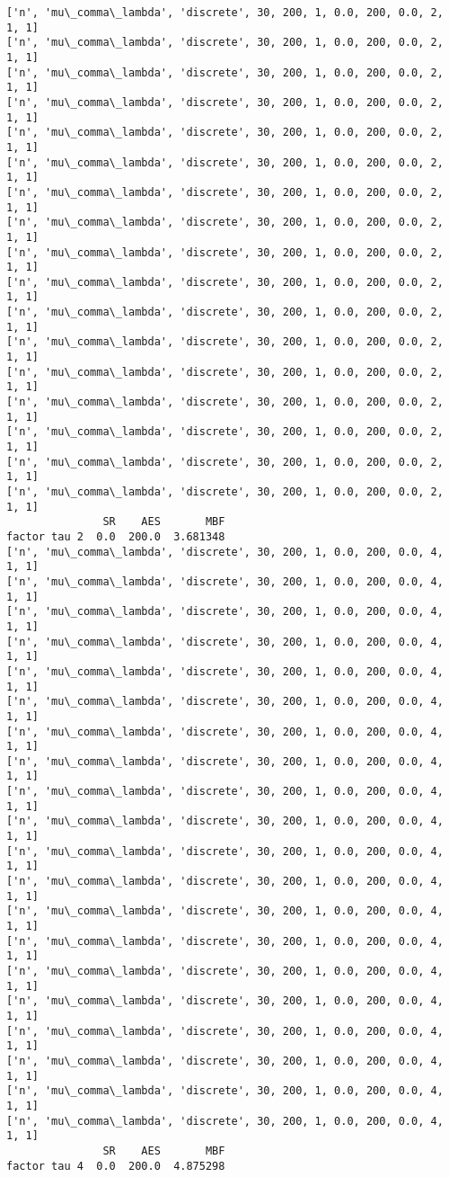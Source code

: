 \documentclass[11pt]{article}
\begin{document}
\begin{Verbatim}[commandchars=\\\{\}]
['n', 'mu\_comma\_lambda', 'discrete', 30, 200, 1, 0.0, 200, 0.0, 2, 1, 1]
['n', 'mu\_comma\_lambda', 'discrete', 30, 200, 1, 0.0, 200, 0.0, 2, 1, 1]
['n', 'mu\_comma\_lambda', 'discrete', 30, 200, 1, 0.0, 200, 0.0, 2, 1, 1]
['n', 'mu\_comma\_lambda', 'discrete', 30, 200, 1, 0.0, 200, 0.0, 2, 1, 1]
['n', 'mu\_comma\_lambda', 'discrete', 30, 200, 1, 0.0, 200, 0.0, 2, 1, 1]
['n', 'mu\_comma\_lambda', 'discrete', 30, 200, 1, 0.0, 200, 0.0, 2, 1, 1]
['n', 'mu\_comma\_lambda', 'discrete', 30, 200, 1, 0.0, 200, 0.0, 2, 1, 1]
['n', 'mu\_comma\_lambda', 'discrete', 30, 200, 1, 0.0, 200, 0.0, 2, 1, 1]
['n', 'mu\_comma\_lambda', 'discrete', 30, 200, 1, 0.0, 200, 0.0, 2, 1, 1]
['n', 'mu\_comma\_lambda', 'discrete', 30, 200, 1, 0.0, 200, 0.0, 2, 1, 1]
['n', 'mu\_comma\_lambda', 'discrete', 30, 200, 1, 0.0, 200, 0.0, 2, 1, 1]
['n', 'mu\_comma\_lambda', 'discrete', 30, 200, 1, 0.0, 200, 0.0, 2, 1, 1]
['n', 'mu\_comma\_lambda', 'discrete', 30, 200, 1, 0.0, 200, 0.0, 2, 1, 1]
['n', 'mu\_comma\_lambda', 'discrete', 30, 200, 1, 0.0, 200, 0.0, 2, 1, 1]
['n', 'mu\_comma\_lambda', 'discrete', 30, 200, 1, 0.0, 200, 0.0, 2, 1, 1]
['n', 'mu\_comma\_lambda', 'discrete', 30, 200, 1, 0.0, 200, 0.0, 2, 1, 1]
['n', 'mu\_comma\_lambda', 'discrete', 30, 200, 1, 0.0, 200, 0.0, 2, 1, 1]
               SR    AES       MBF
factor tau 2  0.0  200.0  3.681348
['n', 'mu\_comma\_lambda', 'discrete', 30, 200, 1, 0.0, 200, 0.0, 4, 1, 1]
['n', 'mu\_comma\_lambda', 'discrete', 30, 200, 1, 0.0, 200, 0.0, 4, 1, 1]
['n', 'mu\_comma\_lambda', 'discrete', 30, 200, 1, 0.0, 200, 0.0, 4, 1, 1]
['n', 'mu\_comma\_lambda', 'discrete', 30, 200, 1, 0.0, 200, 0.0, 4, 1, 1]
['n', 'mu\_comma\_lambda', 'discrete', 30, 200, 1, 0.0, 200, 0.0, 4, 1, 1]
['n', 'mu\_comma\_lambda', 'discrete', 30, 200, 1, 0.0, 200, 0.0, 4, 1, 1]
['n', 'mu\_comma\_lambda', 'discrete', 30, 200, 1, 0.0, 200, 0.0, 4, 1, 1]
['n', 'mu\_comma\_lambda', 'discrete', 30, 200, 1, 0.0, 200, 0.0, 4, 1, 1]
['n', 'mu\_comma\_lambda', 'discrete', 30, 200, 1, 0.0, 200, 0.0, 4, 1, 1]
['n', 'mu\_comma\_lambda', 'discrete', 30, 200, 1, 0.0, 200, 0.0, 4, 1, 1]
['n', 'mu\_comma\_lambda', 'discrete', 30, 200, 1, 0.0, 200, 0.0, 4, 1, 1]
['n', 'mu\_comma\_lambda', 'discrete', 30, 200, 1, 0.0, 200, 0.0, 4, 1, 1]
['n', 'mu\_comma\_lambda', 'discrete', 30, 200, 1, 0.0, 200, 0.0, 4, 1, 1]
['n', 'mu\_comma\_lambda', 'discrete', 30, 200, 1, 0.0, 200, 0.0, 4, 1, 1]
['n', 'mu\_comma\_lambda', 'discrete', 30, 200, 1, 0.0, 200, 0.0, 4, 1, 1]
['n', 'mu\_comma\_lambda', 'discrete', 30, 200, 1, 0.0, 200, 0.0, 4, 1, 1]
['n', 'mu\_comma\_lambda', 'discrete', 30, 200, 1, 0.0, 200, 0.0, 4, 1, 1]
['n', 'mu\_comma\_lambda', 'discrete', 30, 200, 1, 0.0, 200, 0.0, 4, 1, 1]
['n', 'mu\_comma\_lambda', 'discrete', 30, 200, 1, 0.0, 200, 0.0, 4, 1, 1]
['n', 'mu\_comma\_lambda', 'discrete', 30, 200, 1, 0.0, 200, 0.0, 4, 1, 1]
               SR    AES       MBF
factor tau 4  0.0  200.0  4.875298

    \end{Verbatim}
\end{document}
